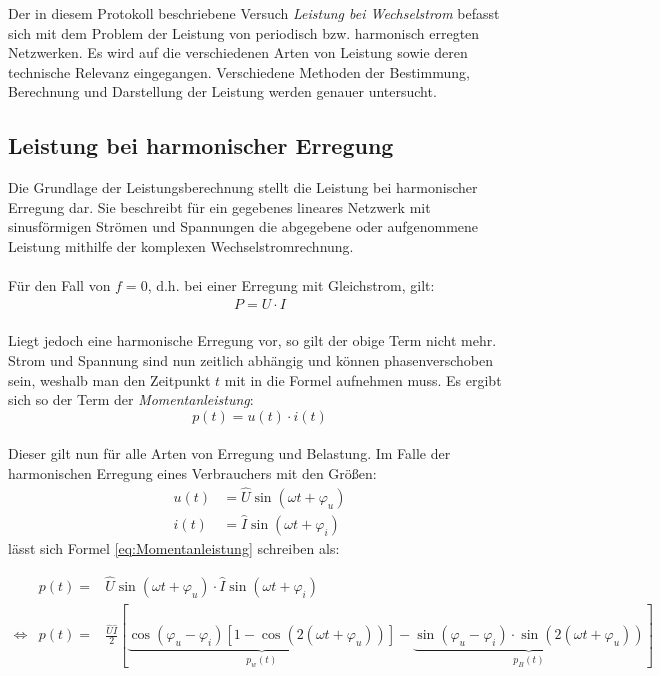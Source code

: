 
Der in diesem Protokoll beschriebene Versuch \textit{Leistung bei Wechselstrom} befasst sich mit dem Problem der Leistung von periodisch bzw. harmonisch erregten Netzwerken. Es wird auf die verschiedenen Arten von Leistung sowie deren technische Relevanz eingegangen. Verschiedene Methoden der Bestimmung, Berechnung und Darstellung der Leistung werden genauer untersucht.

\subsection{Leistung bei harmonischer Erregung}

Die Grundlage der Leistungsberechnung stellt die Leistung bei harmonischer Erregung dar. Sie beschreibt für ein gegebenes lineares Netzwerk mit sinusförmigen Strömen und Spannungen die abgegebene oder aufgenommene Leistung mithilfe der komplexen Wechselstromrechnung.\\
\\
Für den Fall von $f=0$, d.h. bei einer Erregung mit Gleichstrom, gilt:
\begin{align*}
P=U\cdot I
\end{align*}
\\
Liegt jedoch eine harmonische Erregung vor, so gilt der obige Term nicht mehr. Strom und Spannung sind nun zeitlich abhängig und können phasenverschoben sein, weshalb man den Zeitpunkt $t$ mit in die Formel aufnehmen muss. Es ergibt sich so der Term der \textit{Momentanleistung}:
\begin{equation} \label{eq:Momentanleistung}
p(t)=u(t)\cdot i(t)
\end{equation}
\\
Dieser gilt nun für alle Arten von Erregung und Belastung. Im Falle der harmonischen Erregung eines Verbrauchers mit den Größen:
\begin{align*}
u(t) &= \hat{U}\sin(\omega t + \varphi_u)\\
i(t) &= \hat{I}\sin(\omega t + \varphi_i)
\end{align*}
lässt sich Formel \eqref{eq:Momentanleistung} schreiben als:
\begin{small}
\begin{eqnarray}
&p(t)=&\hat{U}\sin(\omega t + \varphi_u) \cdot \hat{I}\sin(\omega t + \varphi_i) \nonumber \\
\Leftrightarrow & p(t) =&\frac{\hat{U}\hat{I}}{2}\left[\underbrace{\cos(\varphi_u-\varphi_i)[1-\cos(2(\omega t + \varphi_u))]}_{p_w(t)}-\underbrace{\sin(\varphi_u-\varphi_i)\cdot\sin(2(\omega t + \varphi_u))}_{p_B(t)}\right] \label{eq:MomLeistungSplit}
\end{eqnarray}
\end{small}

